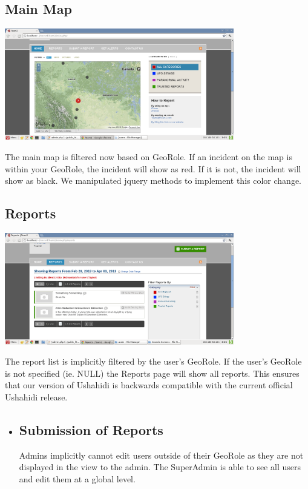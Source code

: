 \documentclass{article}
\begin{document}
\subsection{Main Map}
\begin{minipage}{\linewidth}
  \centering
  \includegraphics[width=100mm]{mainmapscreen.png}
\end{minipage}
The main map is filtered now based on GeoRole. If an incident on the map is within your GeoRole, the incident will show as red. If it is not, the incident will show as black. We manipulated jquery methods to implement this color change.

\subsection{Reports} 
\begin{minipage}{\linewidth}
  \centering
  \includegraphics[width=100mm]{reports_list.png}
\end{minipage}
The report list is implicitly filtered by the user's GeoRole. If the user's GeoRole is not specified (ie. NULL) the Reports page will show all reports. This ensures that our version of Ushahidi is backwards compatible with the current official Ushahidi release.
\begin{itemize}
\item \subsection{Submission of Reports}
Admins implicitly cannot edit users outside of their GeoRole as they are not displayed in the view to the admin. The SuperAdmin is able to see all users and edit them at a global level.
\end{itemize}
\end{document}
